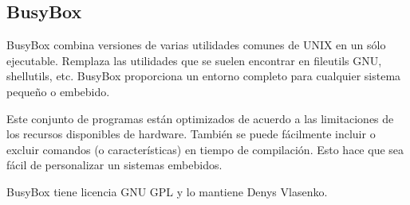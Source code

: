 		\subsection{BusyBox}	
 	
				
			 
BusyBox \cite{Etiqueta36} combina versiones de varias utilidades comunes de UNIX en un sólo ejecutable. Remplaza las utilidades que se suelen encontrar en fileutils GNU, shellutils, etc. %
BusyBox proporciona un entorno  completo para cualquier sistema pequeño o embebido.

Este conjunto de programas están optimizados de acuerdo a las limitaciones de los recursos disponibles de hardware. También se puede fácilmente incluir o excluir comandos (o características) en tiempo de compilación. Esto hace que sea fácil de personalizar un sistemas embebidos. 


BusyBox tiene licencia GNU GPL y lo mantiene Denys Vlasenko.

			
 			
 
